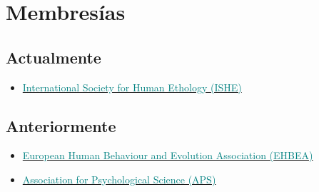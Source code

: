 \documentclass[11pt, a4paper]{awesome-cv}
\providecommand{\tightlist}{%
	\setlength{\itemsep}{0pt}\setlength{\parskip}{0pt}}
\begin{document}
\begin{cventries}
\end{cventries}

\hypertarget{membresuxedas}{%
\section{Membresías}\label{membresuxedas}}

\hypertarget{actualmente}{%
\subsection{Actualmente}\label{actualmente}}

\begin{itemize}
\tightlist
\item
  \href{https://ishe.org/}{\textcolor{teal}{International Society for Human Ethology (ISHE)}}
\end{itemize}

\hypertarget{anteriormente}{%
\subsection{Anteriormente}\label{anteriormente}}

\begin{itemize}
\tightlist
\item
  \href{https://www.cambridge.org/core/membership/ehbea}{\textcolor{teal}{European Human Behaviour and Evolution Association (EHBEA)}}
\item
  \href{https://www.psychologicalscience.org/}{\textcolor{teal}{Association for Psychological Science (APS)}}
\end{itemize}
\end{document}
